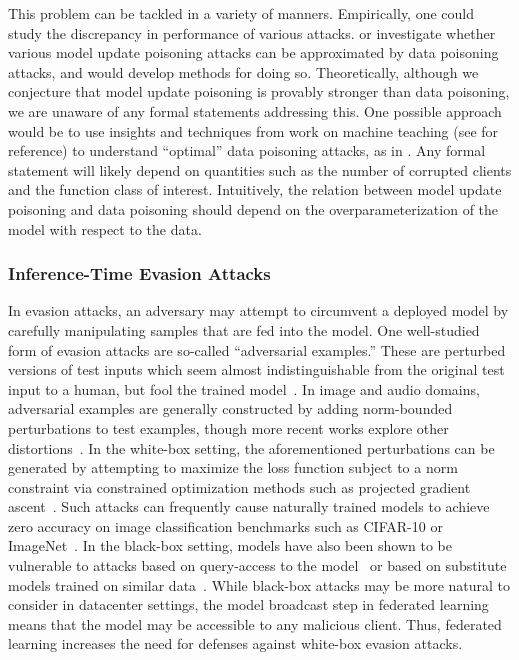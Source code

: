 This problem can be tackled in a variety of manners. Empirically, one could study the discrepancy in performance of various attacks. or investigate whether various model update poisoning attacks can be approximated by data poisoning attacks, and would develop methods for doing so. Theoretically, although we conjecture that model update poisoning is provably stronger than data poisoning, we are unaware of any formal statements addressing this. One possible approach would be to use insights and techniques from work on machine teaching (see \citep{zhu2015machine} for reference) to understand ``optimal'' data poisoning attacks, as in \citep{mei2015using}. Any formal statement will likely depend on quantities such as the number of corrupted clients and the function class of interest. Intuitively, the relation between model update poisoning and data poisoning should depend on the overparameterization of the model with respect to the data.

\subsubsection{Inference-Time Evasion Attacks}
\label{subsubsec:inference_time_attacks}

In evasion attacks, an adversary may attempt to circumvent a deployed model by carefully manipulating samples that are fed into the model. One well-studied form of evasion attacks are so-called “adversarial examples.” These are perturbed versions of test inputs which seem almost indistinguishable from the original test input to a human, but fool the trained model~\citep{biggio2013evasion, szegedy2013intriguing}.
In image and audio domains, adversarial examples are generally constructed by adding norm-bounded perturbations to test examples, though more recent works explore other distortions~\citep{engstrom2017rotation, wong2019wasserstein, kang2019testing}.
In the white-box setting, the aforementioned perturbations can be generated by attempting to maximize the loss function subject to a norm constraint via constrained optimization methods such as projected gradient ascent~\citep{kurakin2016adversarial, madry2017towards}. 
Such attacks can frequently cause naturally trained models to achieve zero accuracy on image classification benchmarks such as CIFAR-10 or ImageNet~\citep{carlini2017towards}. 
In the black-box setting, models have also been shown to be vulnerable to attacks based on query-access to the model~\citep{chen2017zoo, brendel2017decision} or based on substitute models trained on similar data~\cite{szegedy2013intriguing, papernot2017practical, DBLP:conf/iclr/TramerKPGBM18}. While black-box attacks may be more natural to consider in datacenter settings, the model broadcast step in federated learning means that the model may be accessible to any malicious client. Thus, federated learning increases the need for defenses against white-box evasion attacks.

